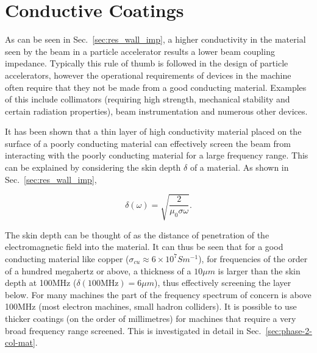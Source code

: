 \section{Conductive Coatings}
\label{sec:conductive_coatings}

As can be seen in Sec.~\ref{sec:res_wall_imp}, a higher conductivity in the material seen by the beam in a particle accelerator results a lower beam coupling impedance. Typically this rule of thumb is followed in the design of particle accelerators, however the operational requirements of devices in the machine often require that they not be made from a good conducting material. Examples of this include collimators (requiring high strength, mechanical stability and certain radiation properties),  beam instrumentation and numerous other devices.

It has been shown \cite{Caspers:ThinCondLayers} that a thin layer of high conductivity material placed on the surface of a poorly conducting material can effectively screen the beam from interacting with the poorly conducting material for a large frequency range. This can be explained by considering the skin depth $\delta$ of a material. As shown in Sec.~\ref{sec:res_wall_imp}, 

\begin{equation}
\delta \left( \omega \right) = \sqrt{\frac{2}{\mu_{0} \sigma \omega}}.
\end{equation}

The skin depth can be thought of as the distance of penetration of the electromagnetic field into the material. It can thus be seen that for a good conducting material like copper ($\sigma_{cu} \approx 6 \times 10^{7} S m^{-1}$), for frequencies of the order of a hundred megahertz or above, a thickness of a $10\mu m$ is larger than the skin depth at 100MHz ($\delta \left( 100\text{MHz} \right) = 6\mu m$), thus effectively screening the layer below. For many machines the part of the frequency spectrum of concern is above 100MHz (most electron machines, small hadron colliders). It is possible to use thicker coatings (on the order of millimetres) for machines that require a very broad frequency range screened. This is investigated in detail in Sec.~\ref{sec:phase-2-col-mat}.

